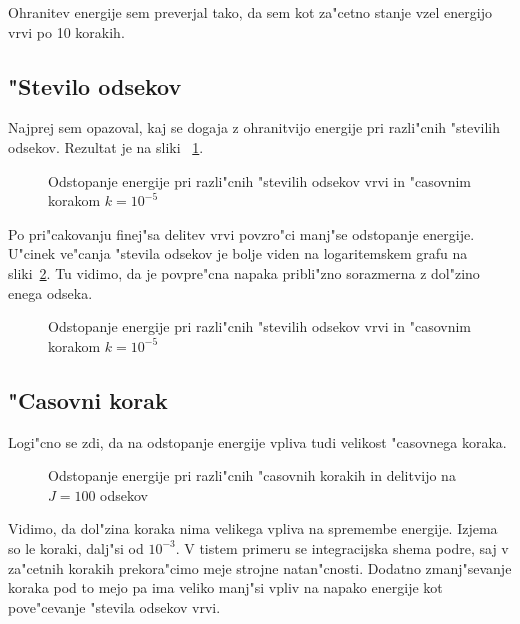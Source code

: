 \documentclass[a4paper,10pt]{article}
\begin{document}
Ohranitev energije sem preverjal tako, da sem kot za"cetno stanje vzel energijo vrvi po 10 korakih. 

\subsection{"Stevilo odsekov}

Najprej sem opazoval, kaj se dogaja z ohranitvijo energije pri razli"cnih "stevilih odsekov. Rezultat je na sliki ~\ref{fig:energija-odseki}. 

\begin{figure}[H]
 
 \caption{Odstopanje energije pri razli"cnih "stevilih odsekov vrvi in "casovnim korakom $k = 10^{-5}$}
 \label{fig:energija-odseki}
\end{figure}

Po pri"cakovanju finej"sa delitev vrvi povzro"ci manj"se odstopanje energije. U"cinek ve"canja "stevila odsekov je bolje viden na logaritemskem grafu na sliki~\ref{fig:energija-odseki-log}. Tu vidimo, da je povpre"cna napaka pribli"zno sorazmerna z dol"zino enega odseka. 

\begin{figure}[H]
 
 \caption{Odstopanje energije pri razli"cnih "stevilih odsekov vrvi in "casovnim korakom $k = 10^{-5}$}
 \label{fig:energija-odseki-log}
\end{figure}

\subsection{"Casovni korak}
\label{sec:casovni-korak}

Logi"cno se zdi, da na odstopanje energije vpliva tudi velikost "casovnega koraka. 

\begin{figure}[H]
 
 \caption{Odstopanje energije pri razli"cnih "casovnih korakih in delitvijo na $J=100$ odsekov}
 \label{fig:energija-korak}
\end{figure}

Vidimo, da dol"zina koraka nima velikega vpliva na spremembe energije. Izjema so le koraki, dalj"si od $10^{-3}$. V tistem primeru se integracijska shema podre, saj v za"cetnih korakih prekora"cimo meje strojne natan"cnosti. Dodatno zmanj"sevanje koraka pod to mejo pa ima veliko manj"si vpliv na napako energije kot pove"cevanje "stevila odsekov vrvi. 
\end{document}
